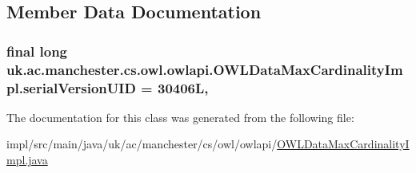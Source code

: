 \subsection{Member Data Documentation}
\hypertarget{classuk_1_1ac_1_1manchester_1_1cs_1_1owl_1_1owlapi_1_1_o_w_l_data_max_cardinality_impl_a333a5186ed9808be946d46b31c34e30c}{
\subsubsection[{serial\-Version\-U\-I\-D}]{\setlength{\rightskip}{0pt plus 5cm}final long uk.\-ac.\-manchester.\-cs.\-owl.\-owlapi.\-O\-W\-L\-Data\-Max\-Cardinality\-Impl.\-serial\-Version\-U\-I\-D = 30406\-L\hspace{0.3cm}{\ttfamily [static]}, {\ttfamily [private]}}}\label{classuk_1_1ac_1_1manchester_1_1cs_1_1owl_1_1owlapi_1_1_o_w_l_data_max_cardinality_impl_a333a5186ed9808be946d46b31c34e30c}


The documentation for this class was generated from the following file\-:\begin{DoxyCompactItemize}
\item 
impl/src/main/java/uk/ac/manchester/cs/owl/owlapi/\hyperlink{_o_w_l_data_max_cardinality_impl_8java}{O\-W\-L\-Data\-Max\-Cardinality\-Impl.\-java}\end{DoxyCompactItemize}
